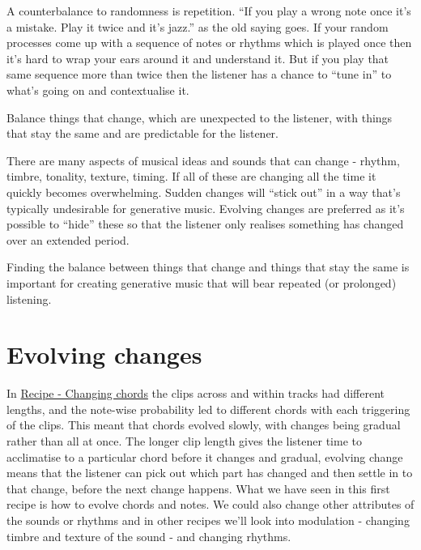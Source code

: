 \documentclass[
  12pt,
  letterpaper,
  oneside,
  open=any]{scrbook}
\begin{document}
A counterbalance to randomness is repetition. ``If you play a wrong note
once it's a mistake. Play it twice and it's jazz.'' as the old saying
goes. If your random processes come up with a sequence of notes or
rhythms which is played once then it's hard to wrap your ears around it
and understand it. But if you play that same sequence more than twice
then the listener has a chance to ``tune in'' to what's going on and
contextualise it.

\begin{tcolorbox}[enhanced jigsaw, toprule=.15mm, leftrule=.75mm, coltitle=black, bottomtitle=1mm, colbacktitle=quarto-callout-tip-color!10!white, bottomrule=.15mm, opacityback=0, colback=white, arc=.35mm, colframe=quarto-callout-tip-color-frame, opacitybacktitle=0.6, toptitle=1mm, titlerule=0mm, rightrule=.15mm, title=\textcolor{quarto-callout-tip-color}{\faLightbulb}\hspace{0.5em}{Key idea}, left=2mm, breakable]

Balance things that change, which are unexpected to the listener, with
things that stay the same and are predictable for the listener.

There are many aspects of musical ideas and sounds that can change -
rhythm, timbre, tonality, texture, timing. If all of these are changing
all the time it quickly becomes overwhelming. Sudden changes will
``stick out'' in a way that's typically undesirable for generative
music. Evolving changes are preferred as it's possible to ``hide'' these
so that the listener only realises something has changed over an
extended period.

Finding the balance between things that change and things that stay the
same is important for creating generative music that will bear repeated
(or prolonged) listening.

\end{tcolorbox}

\section{Evolving changes}\label{evolving-changes}

In \hyperref[001-Recipe-Changing_Chords]{Recipe - Changing chords} the
clips across and within tracks had different lengths, and the note-wise
probability led to different chords with each triggering of the clips.
This meant that chords evolved slowly, with changes being gradual rather
than all at once. The longer clip length gives the listener time to
acclimatise to a particular chord before it changes and gradual,
evolving change means that the listener can pick out which part has
changed and then settle in to that change, before the next change
happens. What we have seen in this first recipe is how to evolve chords
and notes. We could also change other attributes of the sounds or
rhythms and in other recipes we'll look into modulation - changing
timbre and texture of the sound - and changing rhythms.
\end{document}
